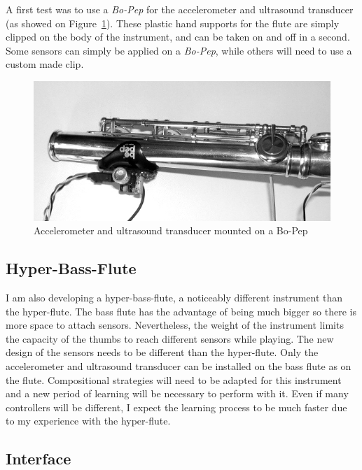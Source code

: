 A first test was to use a \emph{Bo-Pep} for the accelerometer and ultrasound transducer (as showed on Figure~\ref{Palacio-Quintin:bopep}). These plastic hand supports for the flute are simply clipped on the body of the instrument, and can be taken on and off in a second. Some sensors can simply be applied on a \emph{Bo-Pep}, while others will need to use a custom made clip.

 
\begin{figure}
\centerline{
	\includegraphics[width=\columnwidth]{CleoPQ-sensors.jpg}}
\caption{Accelerometer and ultrasound transducer mounted on a Bo-Pep}
\label{Palacio-Quintin:bopep}
\end{figure}


\subsection{Hyper-Bass-Flute}

I am also developing a hyper-bass-flute, a noticeably different instrument than the hyper-flute. The bass flute has the advantage of being much bigger so there is more space to attach sensors. Nevertheless, the weight of the instrument limits the capacity of the thumbs to reach different sensors while playing. The new design of the sensors needs to be different than the hyper-flute. Only the accelerometer and ultrasound transducer can be installed on the bass flute as on the flute. Compositional strategies will need to be adapted for this instrument and a new period of learning will be necessary to perform with it. Even if many controllers will be different, I expect the learning process to be much faster due to my experience with the hyper-flute.


\subsection{Interface}

